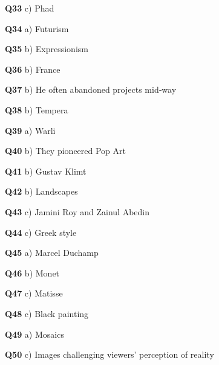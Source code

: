\textbf{Q33} c) Phad\par
\textbf{Q34} a) Futurism\par
\textbf{Q35} b) Expressionism\par
\textbf{Q36} b) France\par
\textbf{Q37} b) He often abandoned projects mid‑way\par
\textbf{Q38} b) Tempera\par
\textbf{Q39} a) Warli\par
\textbf{Q40} b) They pioneered Pop Art\par
\textbf{Q41} b) Gustav Klimt\par
\textbf{Q42} b) Landscapes\par
\textbf{Q43} c) Jamini Roy and Zainul Abedin\par
\textbf{Q44} c) Greek style\par
\textbf{Q45} a) Marcel Duchamp\par
\textbf{Q46} b) Monet\par
\textbf{Q47} c) Matisse\par
\textbf{Q48} c) Black painting\par
\textbf{Q49} a) Mosaics\par
\textbf{Q50} c) Images challenging viewers' perception of reality\par
